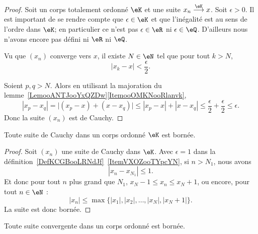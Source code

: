 \begin{proof}
    Soit un corps totalement ordonné \( \eK\) et une suite \( x_n\stackrel{\eK}{\longrightarrow}x\). Soit \( \epsilon>0\). Il est important de se rendre compte que \( \epsilon\in \eK\) et que l'inégalité est au sens de l'ordre dans \( \eK\); en particulier ce n'est pas \( \epsilon\in \eR\) ni \( \epsilon\in \eQ\). D'ailleurs nous n'avons encore pas défini ni \( \eR\) ni \( \eQ\).

    Vu que \( (x_n)\) converge vers \( x\), il existe \( N\in \eN\) tel que pour tout \( k>N\),
    \begin{equation}
        | x_k-x |<\frac \epsilon 2.
    \end{equation}

    Soient \( p,q>N\). Alors en utilisant la majoration du lemme~\ref{LemooANTJooYxQZDw}\ref{ItemooOMKNooRlanvk},
    \begin{equation}
        | x_p-x_q |=\big| (x_p-x)+(x-x_q) \big|\leq | x_p-x |+| x-x_q |\leq \frac \epsilon 2 + \frac \epsilon 2 \leq \epsilon.
    \end{equation}
    Donc la suite \( (x_n)\) est de Cauchy.
\end{proof}


\begin{proposition}\label{PROPCauchyKdoncBornee}
  Toute suite de Cauchy dans un corps ordonné \( \eK \) est bornée.
\end{proposition}

\begin{proof}
  Soit \( (x_n)\) une suite de Cauchy dans \( \eK\). Avec \( \epsilon=1\) dans la définition~\ref{DefKCGBooLRNdJf}~\ref{ItemVXOZooTYpcYN}, si \( n>N_1\), nous avons
            \begin{equation}
                | x_n-x_{N_1} |\leq 1.
            \end{equation}
            Et donc pour tout \( n\) plus grand que \( N_1\), \( x_N-1\leq x_n\leq x_N+1\), ou encore, pour tout \( n  \in \eN \) :
            \begin{equation}
                | x_n |\leq\max\{ | x_1 |,| x_2 |,\ldots,| x_N |,| x_N+1 | \}.
            \end{equation}
            La suite est donc bornée.
\end{proof}


\begin{corollary}\label{CorSuiteConvergenteKBornee}
  Toute suite convergente dans un corps ordonné est bornée.
\end{corollary}

